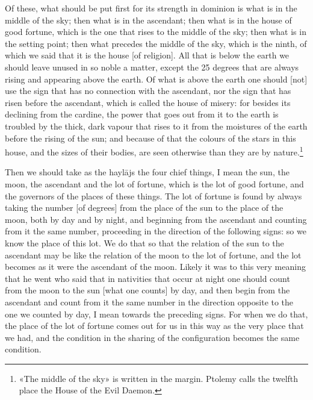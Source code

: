 \documentclass[11pt]{article}
\newcommand{\Fol}[1]{\marginpar{\footnotesize\color{gray}f.\,#1}}
\begin{document}
\par Of these, what should be put first for its strength in dominion is what is in the middle of the sky; then what is in the ascendant; then what is in the house of good fortune, which is the one that rises to the middle of the sky; then what is in the setting point; then what precedes the middle of the sky, which is the ninth, of which we said that it is the house [of religion]. All that is below the earth we should leave unused in so noble a matter, except the 25 degrees that are always rising and appearing above the earth. Of what is above the earth one should [not] use the sign that has no connection with the ascendant, nor the sign that has risen before the ascendant, which is called the house of misery: for besides its declining from the cardine, the power that goes out from it to the earth is troubled by the thick, dark vapour that rises to it from the moistures of the earth before the rising of the sun; and because of that the colours of the stars in this house, and the sizes of their bodies, are seen otherwise than they are by nature.\footnote{«The middle of the sky» is written in the margin. Ptolemy calls the twelfth place the House of the Evil Daemon.}\par
\par \Fol{46r}Then we should take as the haylājs the four chief things, I mean the sun, the moon, the ascendant and the lot of fortune, which is the lot of good fortune, and the governors of the places of these things. The lot of fortune is found by always taking the number [of degrees] from the place of the sun to the place of the moon, both by day and by night, and beginning from the ascendant and counting from it the same number, proceeding in the direction of the following signs: so we know the place of this lot. We do that so that the relation of the sun to the ascendant may be like the relation of the moon to the lot of fortune, and the lot becomes as it were the ascendant of the moon. Likely it was to this very meaning that he went who said that in nativities that occur at night one should count from the moon to the sun [what one counts] by day, and then begin from the ascendant and count from it the same number in the direction opposite to the one we counted by day, I mean towards the preceding signs. For when we do that, the place of the lot of fortune comes out for us in this way as the very place that we had, and the condition in the sharing of the configuration becomes the same condition.\par
\end{document}
